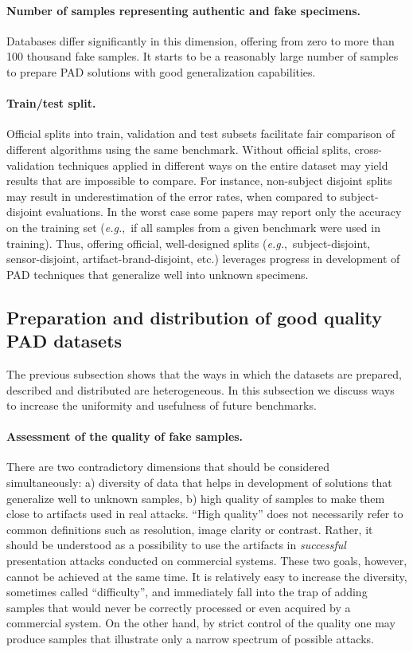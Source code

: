 \documentclass[format=acmsmall, review=false, timestamp=false]{acmart}
\newcommand{\eg}{{\it e.g.},~}
\begin{document}
\paragraph{Number of samples representing authentic and fake specimens.} Databases differ significantly in this dimension, offering from zero to more than 100 thousand {fake} samples. It starts to be a reasonably large number of samples to prepare PAD solutions with good generalization capabilities.

\paragraph{Train/test split.} {O}fficial splits into train, validation and test subsets facilitate fair comparison of different algorithms using the same benchmark. Without official splits, cross-validation techniques applied in different ways on the entire dataset may {yield} results that are impossible to compare. For instance, non-subject disjoint splits may result in underestimation of the error rates, when compared to subject-disjoint evaluations. In the worst case some papers may report only the accuracy on the training set (\eg if all samples from a given benchmark were used in training). Thus, offering official, well-designed splits (\eg subject-disjoint, sensor-disjoint, artifact-brand-disjoint, etc.) leverages progress in development of PAD techniques that generalize well into unknown specimens.



\subsection{Preparation and distribution of good quality PAD datasets}

The previous subsection shows that the ways {in which} the datasets are prepared, described and distributed are heterogeneous. In this subsection we discuss {ways} to increase the uniformity {and usefulness} of future benchmarks.

\paragraph{Assessment of the quality of fake samples.} There are two contradictory dimensions that should be considered simultaneously: a) diversity of data that helps in development of solutions that generalize well to unknown samples, b) high quality of samples to make them close to artifacts used in real attacks. ``High quality'' does not necessarily refer to common definitions such as resolution, image clarity or contrast. {Rather,} {it} should be understood as a possibility to use the artifacts in {\it successful} presentation attacks conducted on commercial system{s}. These two goals, however, cannot be achieved at the same time. It is relatively easy to increas{e} the diversity, sometimes called ``difficulty'', and immediately fall into the trap of adding samples that would never be correctly processed or even acquired by a commercial system. On the other hand, by strict control of the quality one may produce samples that illustrate only a narrow spectrum of possible attacks.
\end{document}
